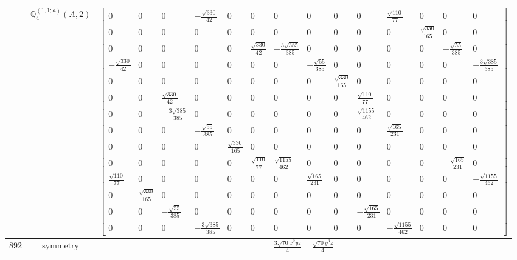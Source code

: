 \documentclass[fleqn,8pt,landscape]{jsarticle}
\begin{document}
\begin{longtable}{ccc}
$  $ & $ \mathbb{Q}_{4}^{(1,1;a)}(A,2) $ & $ \begin{bmatrix} 0 & 0 & 0 & - \frac{\sqrt{330}}{42} & 0 & 0 & 0 & 0 & 0 & 0 & \frac{\sqrt{110}}{77} & 0 & 0 & 0 \\ 0 & 0 & 0 & 0 & 0 & 0 & 0 & 0 & 0 & 0 & 0 & \frac{\sqrt{330}}{165} & 0 & 0 \\ 0 & 0 & 0 & 0 & 0 & \frac{\sqrt{330}}{42} & - \frac{3 \sqrt{385}}{385} & 0 & 0 & 0 & 0 & 0 & - \frac{\sqrt{55}}{385} & 0 \\ - \frac{\sqrt{330}}{42} & 0 & 0 & 0 & 0 & 0 & 0 & - \frac{\sqrt{55}}{385} & 0 & 0 & 0 & 0 & 0 & - \frac{3 \sqrt{385}}{385} \\ 0 & 0 & 0 & 0 & 0 & 0 & 0 & 0 & \frac{\sqrt{330}}{165} & 0 & 0 & 0 & 0 & 0 \\ 0 & 0 & \frac{\sqrt{330}}{42} & 0 & 0 & 0 & 0 & 0 & 0 & \frac{\sqrt{110}}{77} & 0 & 0 & 0 & 0 \\ 0 & 0 & - \frac{3 \sqrt{385}}{385} & 0 & 0 & 0 & 0 & 0 & 0 & \frac{\sqrt{1155}}{462} & 0 & 0 & 0 & 0 \\ 0 & 0 & 0 & - \frac{\sqrt{55}}{385} & 0 & 0 & 0 & 0 & 0 & 0 & \frac{\sqrt{165}}{231} & 0 & 0 & 0 \\ 0 & 0 & 0 & 0 & \frac{\sqrt{330}}{165} & 0 & 0 & 0 & 0 & 0 & 0 & 0 & 0 & 0 \\ 0 & 0 & 0 & 0 & 0 & \frac{\sqrt{110}}{77} & \frac{\sqrt{1155}}{462} & 0 & 0 & 0 & 0 & 0 & - \frac{\sqrt{165}}{231} & 0 \\ \frac{\sqrt{110}}{77} & 0 & 0 & 0 & 0 & 0 & 0 & \frac{\sqrt{165}}{231} & 0 & 0 & 0 & 0 & 0 & - \frac{\sqrt{1155}}{462} \\ 0 & \frac{\sqrt{330}}{165} & 0 & 0 & 0 & 0 & 0 & 0 & 0 & 0 & 0 & 0 & 0 & 0 \\ 0 & 0 & - \frac{\sqrt{55}}{385} & 0 & 0 & 0 & 0 & 0 & 0 & - \frac{\sqrt{165}}{231} & 0 & 0 & 0 & 0 \\ 0 & 0 & 0 & - \frac{3 \sqrt{385}}{385} & 0 & 0 & 0 & 0 & 0 & 0 & - \frac{\sqrt{1155}}{462} & 0 & 0 & 0 \end{bmatrix} $ \\ \hline
$ 892 $ & $ \text{symmetry} $ & $ \frac{3 \sqrt{70} x^{2} y z}{4} - \frac{\sqrt{70} y^{3} z}{4} $ \\

\end{longtable}
\end{document}

